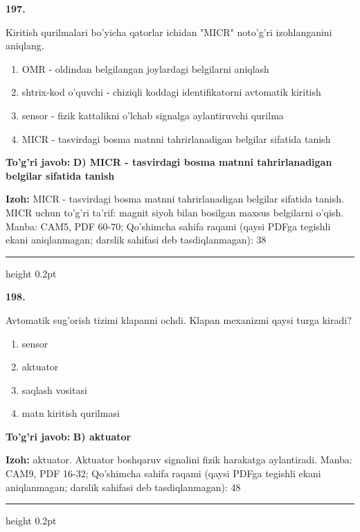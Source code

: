 \documentclass[10pt,a4paper]{article}
\begin{document}
{\bfseries\sffamily\color{ink} 197.}
\par
Kiritish qurilmalari bo'yicha qatorlar ichidan "MICR" noto'g'ri izohlanganini aniqlang.
\begin{enumerate}[label=\Alph*),leftmargin=9mm]
\item OMR - oldindan belgilangan joylardagi belgilarni aniqlash
\item shtrix-kod o'quvchi - chiziqli koddagi identifikatorni avtomatik kiritish
\item sensor - fizik kattalikni o'lchab signalga aylantiruvchi qurilma
\item MICR - tasvirdagi bosma matnni tahrirlanadigan belgilar sifatida tanish
\end{enumerate}
\begin{tcolorbox}[enhanced,breakable,colback=teal!4,colframe=teal!60!black,boxrule=0.45pt,arc=1.2mm,left=2.7mm,right=2.7mm,top=1.8mm,bottom=1.8mm,before skip=2mm,after skip=2mm]
{\bfseries\sffamily\color{teal}To'g'ri javob:} \textbf{D) MICR - tasvirdagi bosma matnni tahrirlanadigan belgilar sifatida tanish}
\par\smallskip
{\bfseries Izoh:} MICR - tasvirdagi bosma matnni tahrirlanadigan belgilar sifatida tanish. MICR uchun to'g'ri ta'rif: magnit siyoh bilan bosilgan maxsus belgilarni o'qish. Manba: CAM5, PDF 60-70; Qo'shimcha sahifa raqami (qaysi PDFga tegishli ekani aniqlanmagan; darslik sahifasi deb tasdiqlanmagan): 38
\end{tcolorbox}
\vspace{2mm}\hrule height 0.2pt\vspace{3mm}

{\bfseries\sffamily\color{ink} 198.}
\par
Avtomatik sug'orish tizimi klapanni ochdi. Klapan mexanizmi qaysi turga kiradi?
\begin{enumerate}[label=\Alph*),leftmargin=9mm]
\item sensor
\item aktuator
\item saqlash vositasi
\item matn kiritish qurilmasi
\end{enumerate}
\begin{tcolorbox}[enhanced,breakable,colback=teal!4,colframe=teal!60!black,boxrule=0.45pt,arc=1.2mm,left=2.7mm,right=2.7mm,top=1.8mm,bottom=1.8mm,before skip=2mm,after skip=2mm]
{\bfseries\sffamily\color{teal}To'g'ri javob:} \textbf{B) aktuator}
\par\smallskip
{\bfseries Izoh:} aktuator. Aktuator boshqaruv signalini fizik harakatga aylantiradi. Manba: CAM9, PDF 16-32; Qo'shimcha sahifa raqami (qaysi PDFga tegishli ekani aniqlanmagan; darslik sahifasi deb tasdiqlanmagan): 48
\end{tcolorbox}
\vspace{2mm}\hrule height 0.2pt\vspace{3mm}
\end{document}
